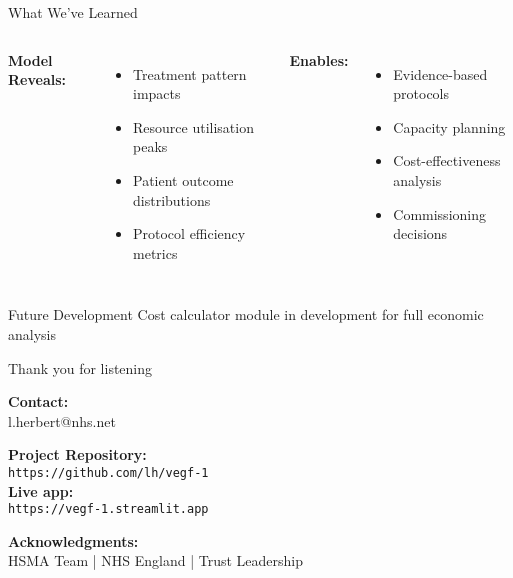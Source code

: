\documentclass[10pt,aspectratio=169]{beamer}
\begin{document}
\begin{frame}{What We've Learned}
\begin{columns}[T]
\textbf{Model Reveals:}
\begin{itemize}
    \item Treatment pattern impacts
    \item Resource utilisation peaks
    \item Patient outcome distributions
    \item Protocol efficiency metrics
\end{itemize}

\textbf{Enables:}
\begin{itemize}
    \item Evidence-based protocols
    \item Capacity planning
    \item Cost-effectiveness analysis
    \item Commissioning decisions
\end{itemize}
\end{columns}

\vspace{0.5cm}
\begin{alertblock}{Future Development}
Cost calculator module in development for full economic analysis
\end{alertblock}
\end{frame}

\begin{frame}{Thank you for listening}
\centering


\vspace{1cm}
\normalsize
\textbf{Contact:}\\
l.herbert@nhs.net

\vspace{0.5cm}
\textbf{Project Repository:}\\
\texttt{https://github.com/lh/vegf-1}\\
\textbf{Live app:}\\
\texttt{https://vegf-1.streamlit.app}

\vspace{0.5cm}
\textbf{Acknowledgments:}\\
HSMA Team | NHS England | Trust Leadership
\end{frame}
\end{document}
